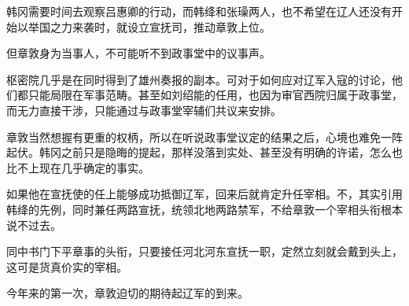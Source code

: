 韩冈需要时间去观察吕惠卿的行动，而韩绛和张璪两人，也不希望在辽人还没有开始以举国之力来袭时，就设立宣抚司，推动章敦上位。

但章敦身为当事人，不可能听不到政事堂中的议事声。

枢密院几乎是在同时得到了雄州奏报的副本。可对于如何应对辽军入寇的讨论，他们都只能局限在军事范畴。甚至如刘绍能的任用，也因为审官西院归属于政事堂，而无力直接干涉，只能通过与政事堂宰辅们共议来安排。

章敦当然想握有更重的权柄，所以在听说政事堂议定的结果之后，心境也难免一阵起伏。韩冈之前只是隐晦的提起，那样没落到实处、甚至没有明确的许诺，怎么也比不上现在几乎确定的事实。

如果他在宣抚使的任上能够成功抵御辽军，回来后就肯定升任宰相。不，其实引用韩绛的先例，同时兼任两路宣抚，统领北地两路禁军，不给章敦一个宰相头衔根本说不过去。

同中书门下平章事的头衔，只要接任河北河东宣抚一职，定然立刻就会戴到头上，这可是货真价实的宰相。

今年来的第一次，章敦迫切的期待起辽军的到来。
